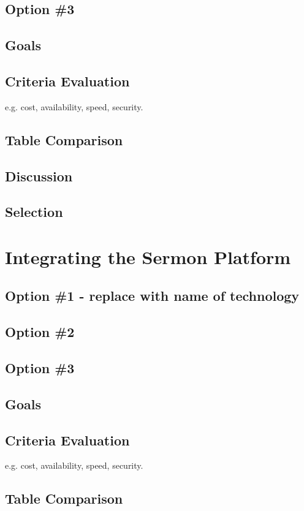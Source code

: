 \documentclass[letterpaper,10pt,draftclsnofoot,onecolumn,titlepage]{IEEEtran}
\begin{document}
	\subsection{Option \#3}
	\subsection{Goals}
	\subsection{Criteria Evaluation}
	e.g. cost, availability, speed, security.
	\subsection{Table Comparison}
	\subsection{Discussion}
	\subsection{Selection}
	
	\section{Integrating the Sermon Platform}
	\subsection{Option \#1 - replace with name of technology}
	\subsection{Option \#2}
	\subsection{Option \#3}
	\subsection{Goals}
	\subsection{Criteria Evaluation}
	e.g. cost, availability, speed, security.
	\subsection{Table Comparison}
\end{document}
